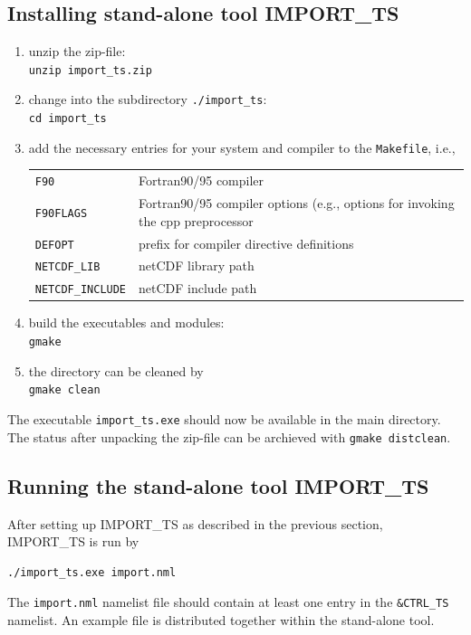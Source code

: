 \documentclass[11pt,twoside]{report}
\begin{document}
\subsection{Installing stand-alone tool IMPORT\_TS}
\begin{enumerate}
\item unzip the zip-file:\\
\verb|unzip import_ts.zip|
\item change into the subdirectory \verb|./import_ts|:\\
\verb|cd import_ts|
\item add the necessary entries for your system and compiler to the \verb|Makefile|, i.e.,

\begin{tabular}{lp{12cm}}
 \verb|F90| & Fortran90/95 compiler \\
 \verb|F90FLAGS| & Fortran90/95 compiler options (e.g., options for invoking the cpp preprocessor \\
 \verb|DEFOPT| &  prefix for compiler directive definitions \\
\verb|NETCDF_LIB| & netCDF library path \\
\verb|NETCDF_INCLUDE| & netCDF include path\\
\end{tabular}

\item build the executables and modules:\\
\verb|gmake|

\item the directory can be cleaned by\\
\verb|gmake clean|
\end{enumerate}
The executable \verb|import_ts.exe| should now be available in the  
 main directory. 
The status after unpacking the zip-file can be archieved with
\verb|gmake distclean|.

\subsection{Running the stand-alone tool IMPORT\_TS\label{ITSBOXrun}}
After setting up IMPORT\_TS as described in the previous section, IMPORT\_TS
is run by 
\begin{verbatim}
./import_ts.exe import.nml
\end{verbatim}

The \verb|import.nml| namelist file should contain at least one entry in the
\verb|&CTRL_TS| namelist.
An example file is distributed together within the stand-alone tool.
\end{document}
